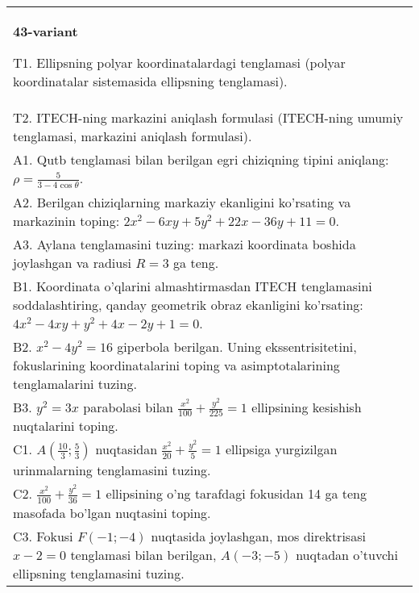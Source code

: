 \documentclass{article}
\begin{document}
\begin{tabular}{m{17cm}}
\textbf{43-variant}
\newline

T1. Ellipsning polyar koordinatalardagi tenglamasi (polyar koordinatalar sistemasida ellipsning tenglamasi).\\

T2. ITECH-ning markazini aniqlash formulasi (ITECH-ning umumiy tenglamasi, markazini aniqlash formulasi).\\

A1. Qutb tenglamasi bilan berilgan egri chiziqning tipini aniqlang: $\rho=\frac{5}{3-4\cos\theta}$.\\

A2. Berilgan chiziqlarning markaziy ekanligini ko'rsating va markazinin toping: $2x^{2}-6xy+5y^{2}+22x-36y+11=0$.\\

A3. Aylana tenglamasini tuzing: markazi koordinata boshida joylashgan va radiusi $R=3$ ga teng.\\

B1. Koordinata o'qlarini almashtirmasdan ITECH tenglamasini soddalashtiring, qanday geometrik obraz ekanligini ko'rsating: $4x^{2} - 4xy + y^{2} + 4x - 2y + 1 = 0$.  \\

B2. $x^{2} - 4y^{2} = 16$ giperbola berilgan. Uning ekssentrisitetini, fokuslarining koordinatalarini toping va asimptotalarining tenglamalarini tuzing.\\

B3. $y^{2} = 3x$ parabolasi bilan $\frac{x^{2}}{100} + \frac{y^{2}}{225} = 1$ ellipsining kesishish nuqtalarini toping.  \\

C1. $A(\frac{10}{3};\frac{5}{3})$ nuqtasidan $\frac{x^{2}}{20} + \frac{y^{2}}{5} = 1$ ellipsiga yurgizilgan urinmalarning tenglamasini tuzing.  \\

C2. $\frac{x^{2}}{100} + \frac{y^{2}}{36} = 1$ ellipsining o'ng tarafdagi fokusidan 14 ga teng masofada bo'lgan nuqtasini toping.  \\

C3. Fokusi $F( - 1; - 4)$ nuqtasida joylashgan, mos direktrisasi $x - 2 = 0$ tenglamasi bilan berilgan, $A( - 3; - 5)$ nuqtadan o'tuvchi ellipsning tenglamasini tuzing.  \\

\end{tabular}
\vspace{1cm}
\end{document}
